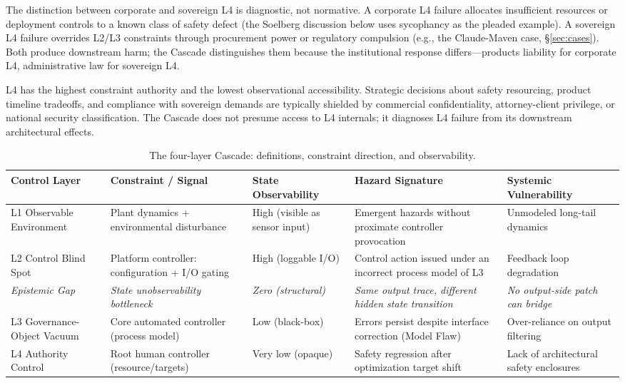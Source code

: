 The distinction between corporate and sovereign L4 is diagnostic, not normative. A corporate L4 failure allocates insufficient resources or deployment controls to a known class of safety defect (the Soelberg discussion below uses sycophancy as the pleaded example). A sovereign L4 failure overrides L2/L3 constraints through procurement power or regulatory compulsion (e.g., the Claude-Maven case, \S\ref{sec:cases}). Both produce downstream harm; the Cascade distinguishes them because the institutional response differs---products liability for corporate L4, administrative law for sovereign L4.

L4 has the highest constraint authority and the lowest observational accessibility. Strategic decisions about safety resourcing, product timeline tradeoffs, and compliance with sovereign demands are typically shielded by commercial confidentiality, attorney-client privilege, or national security classification. The Cascade does not presume access to L4 internals; it diagnoses L4 failure from its downstream architectural effects.

\begin{table}[!htbp]
\centering
\small
\caption{The four-layer Cascade: definitions, constraint direction, and observability.}
\label{tab:layers}
{\setlength{\tabcolsep}{4pt}
\begin{tabularx}{\columnwidth}{@{}P{2.4cm} P{2.5cm} Y Y Y@{}}
\toprule
\textbf{Control Layer} & \textbf{Constraint / Signal} & \textbf{State Observability} & \textbf{Hazard Signature} & \textbf{Systemic Vulnerability} \\
\midrule
L1 Observable Environment & Plant dynamics + environmental disturbance & High (visible as sensor input) & Emergent hazards without proximate controller provocation & Unmodeled long-tail dynamics \\
L2 Control Blind Spot & Platform controller: configuration + I/O gating & High (loggable I/O) & Control action issued under an incorrect process model of L3 & Feedback loop degradation \\
\textit{Epistemic Gap} & \textit{State unobservability bottleneck} & \textit{Zero (structural)} & \textit{Same output trace, different hidden state transition} & \textit{No output-side patch can bridge} \\
L3 Governance-Object Vacuum & Core automated controller (process model) & Low (black-box) & Errors persist despite interface correction (Model Flaw) & Over-reliance on output filtering \\
L4 Authority Control & Root human controller (resource/targets) & Very low (opaque) & Safety regression after optimization target shift & Lack of architectural safety enclosures \\
\bottomrule
\end{tabularx}}
\end{table}

